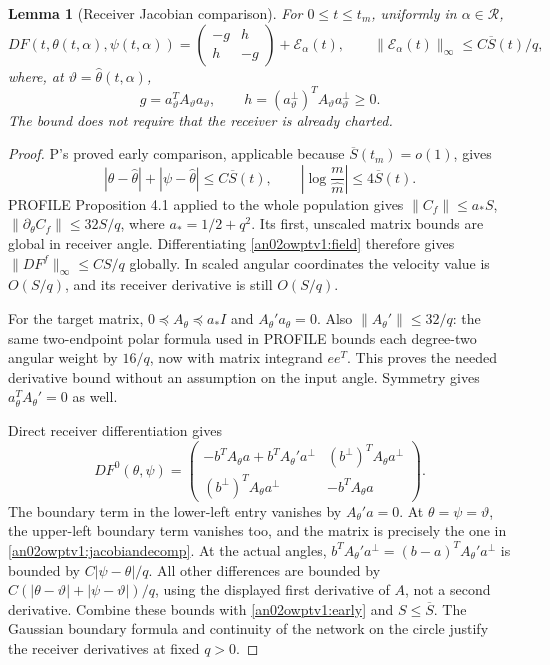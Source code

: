 \documentclass[11pt]{article}
\newtheorem{lemma}[theorem]{Lemma}
\theoremstyle{remark}\newtheorem{remark}[theorem]{Remark}
\newcommand{\Rhalf}{\mathcal R}
\begin{document}
\begin{lemma}[Receiver Jacobian comparison]
\label{an02owptv1:jacobian}
For $0\le t\le t_m$, uniformly in $\alpha\in\Rhalf$,
\begin{equation}\label{an02owptv1:jacobiandecomp}
 D F(t,\theta(t,\alpha),\psi(t,\alpha))
 =\begin{pmatrix}-g&h\\h&-g\end{pmatrix}+\mathcal E_\alpha(t),
 \qquad \|\mathcal E_\alpha(t)\|_\infty
 \le C\overline S(t)/q,
\end{equation}
where, at $\vartheta=\widehat\theta(t,\alpha)$,
\[
 g=a_\vartheta^TA_\vartheta a_\vartheta,\qquad
 h=(a_\vartheta^\perp)^TA_\vartheta a_\vartheta^\perp\ge0.
\]
The bound does not require that the receiver is already charted.
\end{lemma}
\begin{proof}
P's proved early comparison, applicable because
$\overline S(t_m)=o(1)$, gives
\begin{equation}\label{an02owptv1:early}
 |\theta-\widehat\theta|+|\psi-\widehat\theta|
 \le C\overline S(t),\qquad
 \left|\log\frac{m}{\widehat m}\right|\le4\overline S(t).
\end{equation}
PROFILE Proposition 4.1 applied to the whole population gives
$\|C_f\|\le a_*S$, $\|\partial_\theta C_f\|\le32S/q$,
where $a_*=1/2+q^2$. Its first, unscaled matrix bounds are global
in receiver angle. Differentiating \eqref{an02owptv1:field} therefore
gives $\|DF^f\|_\infty\le CS/q$ globally. In scaled angular
coordinates the velocity value is $O(S/q)$, and its receiver
derivative is still $O(S/q)$.

For the target matrix, $0\preceq A_\theta\preceq a_*I$ and
$A_\theta'a_\theta=0$. Also $\|A_\theta'\|\le32/q$:
the same two-endpoint polar formula used in PROFILE bounds each
degree-two angular weight by $16/q$, now with matrix integrand
$ee^T$. This proves the needed derivative bound without an
assumption on the input angle. Symmetry gives
$a_\theta^TA_\theta'=0$ as well.

Direct receiver differentiation gives
\[
 DF^0(\theta,\psi)=
 \begin{pmatrix}
 -b^TA_\theta a+b^TA_\theta'a^\perp & (b^\perp)^TA_\theta a^\perp\\
 (b^\perp)^TA_\theta a^\perp & -b^TA_\theta a
 \end{pmatrix}.
\]
The boundary term in the lower-left entry vanishes by $A_\theta'a=0$.
At $\theta=\psi=\vartheta$, the upper-left boundary term vanishes
too, and the matrix is precisely the one in
\eqref{an02owptv1:jacobiandecomp}. At the actual angles,
$b^TA_\theta'a^\perp=(b-a)^TA_\theta'a^\perp$ is bounded by
$C|\psi-\theta|/q$. All other differences are bounded by
$C(|\theta-\vartheta|+|\psi-\vartheta|)/q$, using the displayed
first derivative of $A$, not a second derivative. Combine these
bounds with \eqref{an02owptv1:early} and $S\le\overline S$.
The Gaussian boundary formula and continuity of the network on the
circle justify the receiver derivatives at fixed $q>0$.
\end{proof}
\end{document}
